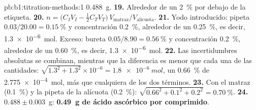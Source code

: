 \begin{solution}{pb:b1:titration-methods:1}
\qty{0.488}{g}.
\textbf{19.} Alrededor de un \qty{2}{\percent} por debajo de la etiqueta.
\textbf{20.} $n = \bigl(C_IV_I - \frac12C_TV_T\bigr)\,V_{\text{matraz}}/V_{\text{alícuota}}$.
\textbf{21.} Yodo introducido: pipeta $0.03/20.00 = \qty{0.15}{\percent}$
y concentración \qty{0.2}{\percent}, alrededor de un \qty{0.25}{\percent},
es decir, \qty{1.3e-6}{mol}. Exceso: bureta $0.05/8.90 = \qty{0.56}{\percent}$
y concentración \qty{0.2}{\percent}, alrededor de un
\qty{0.60}{\percent}, es decir, \qty{1.3e-6}{mol}.
\textbf{22.} Las incertidumbres absolutas se combinan, mientras que la
diferencia es menor que cada una de las cantidades:
$\sqrt{1.3^2 + 1.3^2} \times 10^{-6} =
\qty{1.8e-6}{mol}$, un \qty{0.66}{\percent} de \qty{2.775e-4}{mol}, más
que cualquiera de los dos términos.
\textbf{23.} Con el matraz (\qty{0.1}{\percent}) y la pipeta de la
alícuota
(\qty{0.2}{\percent}): $\sqrt{0.66^2 + 0.1^2 + 0.2^2} = \qty{0.70}{\percent}$.
\textbf{24.} $0.488 \pm 0.003$~g: \textbf{\qty{0.49}{g} de ácido ascórbico
por comprimido}.
\end{solution}

